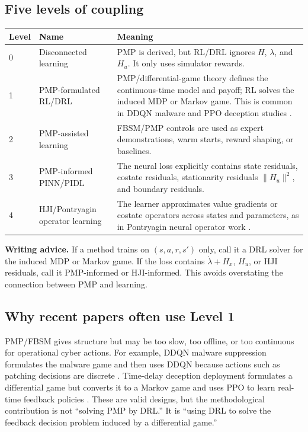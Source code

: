 \documentclass[11pt,a4paper]{article}
\begin{document}
\subsection{Five levels of coupling}
\begin{longtable}{p{}p{}p{}}
\toprule
Level & Name & Meaning \\
\midrule
0 & Disconnected learning & PMP is derived, but RL/DRL ignores $H$, $\lambda$, and $H_u$. It only uses simulator rewards. \\
1 & PMP-formulated RL/DRL & PMP/differential-game theory defines the continuous-time model and payoff; RL solves the induced MDP or Markov game. This is common in DDQN malware and PPO deception studies \cite{shen2023ddqn,he2026timedelay,he2024deception}. \\
2 & PMP-assisted learning & FBSM/PMP controls are used as expert demonstrations, warm starts, reward shaping, or baselines. \\
3 & PMP-informed PINN/PIDL & The neural loss explicitly contains state residuals, costate residuals, stationarity residuals $\|H_u\|^2$, and boundary residuals. \\
4 & HJI/Pontryagin operator learning & The learner approximates value gradients or costate operators across states and parameters, as in Pontryagin neural operator work \cite{zhang2024pno}. \\
\bottomrule
\end{longtable}

\begin{boxednote}
\textbf{Writing advice.}
If a method trains on $(s,a,r,s')$ only, call it a DRL solver for the induced MDP or Markov game. If the loss contains $\dot{\lambda}+H_x$, $H_u$, or HJI residuals, call it PMP-informed or HJI-informed. This avoids overstating the connection between PMP and learning.
\end{boxednote}

\subsection{Why recent papers often use Level 1}
PMP/FBSM gives structure but may be too slow, too offline, or too continuous for operational cyber actions. For example, DDQN malware suppression formulates the malware game and then uses DDQN because actions such as patching decisions are discrete \cite{shen2023ddqn}. Time-delay deception deployment formulates a differential game but converts it to a Markov game and uses PPO to learn real-time feedback policies \cite{he2026timedelay}. These are valid designs, but the methodological contribution is not ``solving PMP by DRL.'' It is ``using DRL to solve the feedback decision problem induced by a differential game.''
\end{document}
